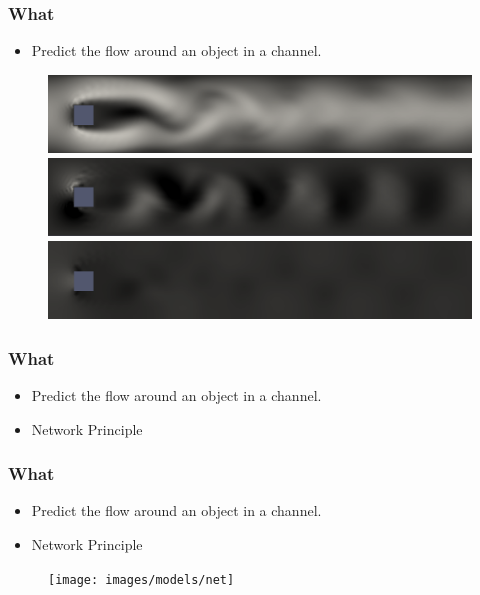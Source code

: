 \documentclass[18pt, xcolor=table]{beamer}
\begin{document}
\begin{frame}[t]
  \frametitle{What}
  \begin{itemize}
  \item Predict the flow around an object in a channel.
  \end{itemize}
  
  \begin{figure}[htb]
    \includegraphics[scale=0.19]{images/true/flow_x}
    \includegraphics[scale=0.19]{images/true/flow_y}
    \includegraphics[scale=0.19]{images/true/flow_p}
  \end{figure}
\end{frame}

  
\begin{frame}[t]
  \frametitle{What}
  \begin{itemize}
  \item Predict the flow around an object in a channel.
  \item Network Principle
  \end{itemize}
\end{frame}


\begin{frame}[t]
  \frametitle{What}

  \begin{itemize}
  \item Predict the flow around an object in a channel.
  \item Network Principle
  \end{itemize}
  \begin{figure}[htb]
    \texttt{[image: images/models/net]}
  \end{figure}
\end{frame}
\end{document}
